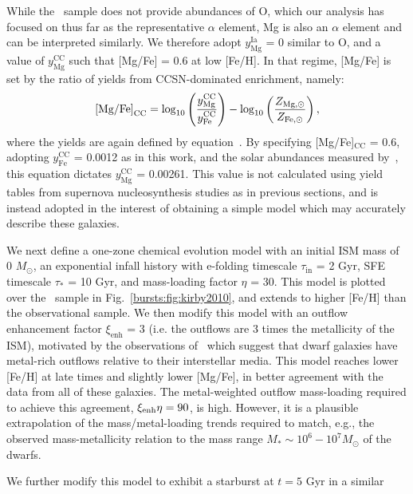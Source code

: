 While the~\citet{Kirby2010} sample does not provide abundances of O, which our 
analysis has focused on thus far as the representative $\alpha$ element, 
Mg is also an $\alpha$ element and can be interpreted similarly. We 
therefore adopt $y_\text{Mg}^\text{Ia}$ = 0 similar to O, and a value of 
$y_\text{Mg}^\text{CC}$ such that [Mg/Fe] = 0.6 at low [Fe/H]. In that regime, 
[Mg/Fe] is set by the ratio of yields from CCSN-dominated enrichment, namely: 
\begin{equation} 
\text{[Mg/Fe]}_\text{CC} = \log_{10}\left(\frac{\displaystyle{y_\text{Mg}^\text{CC}}}{\displaystyle{y_\text{Fe}^\text{CC}}}\right) - \log_{10}\left(\frac{\displaystyle{Z_{\text{Mg,}\odot}}}{\displaystyle{Z_{\text{Fe,}\odot}}}\right), 
\end{equation} 
where the yields are again defined by equation~. 
By specifying [Mg/Fe]$_\text{CC}$ = 0.6, adopting $y_\text{Fe}^\text{CC}$ = 
0.0012 as in this work, and the solar abundances measured 
by~\citet{Asplund2009}, this equation dictates $y_\text{Mg}^\text{CC}$ = 
0.00261. This value is not calculated using yield tables from supernova 
nucleosynthesis studies as in previous sections, and is instead adopted in the 
interest of obtaining a simple model which may accurately describe these 
galaxies. 
\par 
We next define a one-zone chemical evolution model with an initial ISM mass of 
0 $M_\odot$, an exponential infall history with e-folding timescale 
$\tau_\text{in}$ = 2 Gyr, SFE timescale $\tau_*$ = 10 Gyr, and mass-loading 
factor $\eta$ = 30. This model is plotted over the~\citet{Kirby2010} sample in 
Fig.~\ref{bursts:fig:kirby2010}, and extends to higher [Fe/H] than the observational 
sample. We then modify this model with an outflow enhancement factor 
$\xi_\text{enh}$ = 3 (i.e. the outflows are 3 times the metallicity of the 
ISM), motivated by the observations of~\citet{Chisholm2018} which suggest 
that dwarf galaxies have metal-rich outflows relative to their interstellar 
media. This model reaches lower [Fe/H] at late times and slightly lower 
[Mg/Fe], in better agreement with the data from all of these galaxies. 
The metal-weighted outflow mass-loading required to achieve this agreement,
$\xi_{\rm enh}\eta = 90$, is high.
However, it is a plausible extrapolation of the mass/metal-loading trends
required to match, e.g., the observed mass-metallicity relation
\citep{Finlator2008,Peeples2011} to the mass range
$M_* \sim 10^6-10^7 M_\odot$ of the dwarfs.
\par
We further modify this model to exhibit a starburst at $t = 5$ Gyr in a similar 
